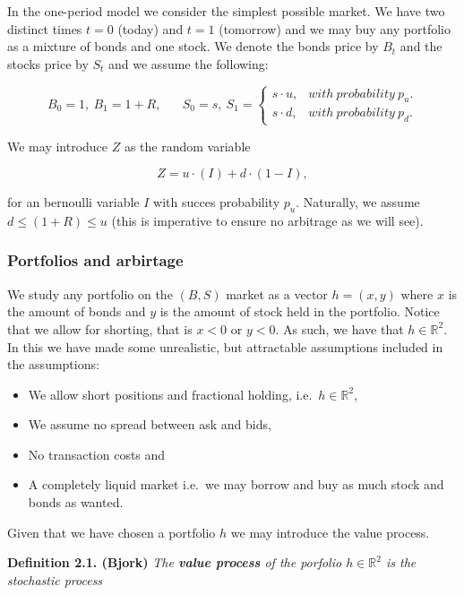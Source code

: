 \documentclass[a4paper,12pt,openany]{book}
\providecommand{\tightlist}{%
 \setlength{\itemsep}{0pt}\setlength{\parskip}{0pt}}
\begin{document}
In the one-period model we consider the simplest possible market. We have two distinct times \(t=0\) (today) and \(t=1\) (tomorrow) and we may buy any portfolio as a mixture of bonds and one stock. We denote the bonds price by \(B_t\) and the stocks price by \(S_t\) and we assume the following:

\[
B_0=1,\ B_1=1+R,\hspace{20pt}S_0=s,\ S_1=\left\{\begin{matrix}s\cdot u, & with\ probability\ p_u.\\s\cdot d, & with\ probability\ p_d.\end{matrix}\right.
\]

We may introduce \(Z\) as the random variable

\[
Z=u\cdot (I)+d\cdot (1-I),
\]

for an bernoulli variable \(I\) with succes probability \(p_u\). Naturally, we assume \(d\le (1+R)\le u\) (this is imperative to ensure no arbitrage as we will see).

\hypertarget{portfolios-and-arbirtage}{%
\subsubsection{Portfolios and arbirtage}\label{portfolios-and-arbirtage}}

We study any portfolio on the \((B,S)\) market as a vector \(h=(x,y)\) where \(x\) is the amount of bonds and \(y\) is the amount of stock held in the portfolio. Notice that we allow for shorting, that is \(x<0\) or \(y<0\). As such, we have that \(h\in \mathbb{R}^2\). In this we have made some unrealistic, but attractable assumptions included in the assumptions:

\begin{itemize}
\tightlist
\item
  We allow short positions and fractional holding, i.e.~\(h\in \mathbb{R}^2\),
\item
  We assume no spread between ask and bids,
\item
  No transaction costs and
\item
  A completely liquid market i.e.~we may borrow and buy as much stock and bonds as wanted.
\end{itemize}

Given that we have chosen a portfolio \(h\) we may introduce the value process.

\textbf{Definition 2.1. (Bjork)} \emph{The \textbf{value process} of the porfolio \(h\in\mathbb{R}^2\) is the stochastic process}
\end{document}
